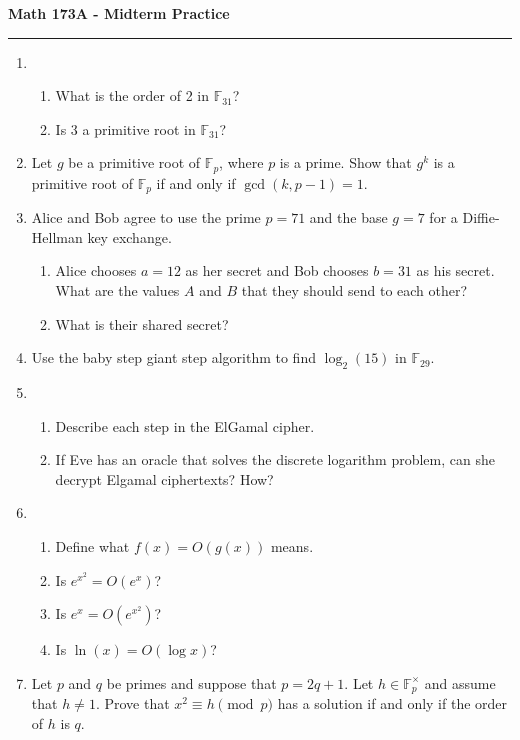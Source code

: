 \documentclass[11pt,letterpaper]{article}
\newcommand{\F}{\mathbb{F}}
\begin{document}
\begin{center}
{\bf \Large Math 173A - Midterm Practice}
\vspace{0.2cm}
\hrule
\end{center}

\begin{enumerate}

    \item \begin{enumerate}
        \item What is the order of 2 in $\F_{31}$?
        \item Is 3 a primitive root in $\F_{31}$?
    \end{enumerate}


    \item Let $g$ be a primitive root of $\F_p$, where $p$ is a prime.
    Show that $g^k$ is a primitive root of $\F_p$ if and only if $\gcd(k, p-1) = 1$.

    \item Alice and Bob agree to use the prime $p=71$ and the base $g=7$ for a Diffie-Hellman key exchange.
    \begin{enumerate}
        \item Alice chooses $a = 12$ as her secret and Bob chooses $b = 31$ as his secret.
        What are the values $A$ and $B$ that they should send to each other?

        \item What is their shared secret?
    \end{enumerate}

    \item Use the baby step giant step algorithm to find $\log_2(15)$ in $\F_{29}$.

    \item \begin{enumerate}

    \item Describe each step in the ElGamal cipher.

    \item If Eve has an oracle that solves the discrete logarithm problem, can she decrypt Elgamal ciphertexts? How?
    \end{enumerate}

    \item \begin{enumerate}
        \item Define what $f(x) = O(g(x))$ means.
        \item Is $e^{x^2} = O(e^x)$?
        \item Is $e^x = O(e^{x^2})$?
        \item Is $\ln(x) = O(\log x)$?
    \end{enumerate}

    \item Let $p$ and $q$ be primes and suppose that $p = 2q+1$.
    Let $h\in \F_p^\times$ and assume that $h\neq 1$.
    Prove that $x^2 \equiv h\pmod p$ has a solution if and only if the order of $h$ is $q$.

\end{enumerate}
\end{document}
